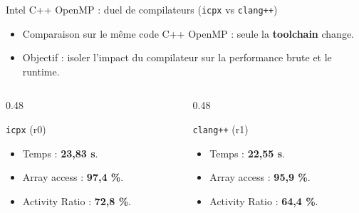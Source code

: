 \begin{frame}{Intel C++ OpenMP : duel de compilateurs (\texttt{icpx} vs \texttt{clang++})}

    \begin{itemize}\setlength{\itemsep}{0pt}
        \fontsize{8}{9}\selectfont
        \item Comparaison sur le même code C++ OpenMP : seule la \textbf{toolchain} change.
        \item Objectif : isoler l'impact du compilateur sur la performance brute et le runtime.
    \end{itemize}

    \centering

    \vspace{-0.8cm}
    \begin{columns}[T,onlytextwidth]
        \begin{column}{0.48\textwidth}
            \begin{exampleblock}{\footnotesize \texttt{icpx} (r0)}
                \fontsize{7}{8}\selectfont
                \begin{itemize}\setlength{\itemsep}{0pt}
                    \item Temps : \textbf{23,83 s}.
                    \item Array access : \textbf{97,4 \%}.
                    \item Activity Ratio : \textbf{72,8 \%}.
                \end{itemize}
            \end{exampleblock}
        \end{column}
        \begin{column}{0.48\textwidth}
            \begin{alertblock}{\footnotesize \texttt{clang++} (r1)}
                \fontsize{7}{8}\selectfont
                \begin{itemize}\setlength{\itemsep}{0pt}
                    \item Temps : \textbf{22,55 s}.
                    \item Array access : \textbf{95,9 \%}.
                    \item Activity Ratio : \textbf{64,4 \%}.
                \end{itemize}
            \end{alertblock}
        \end{column}
    \end{columns}
\end{frame}

